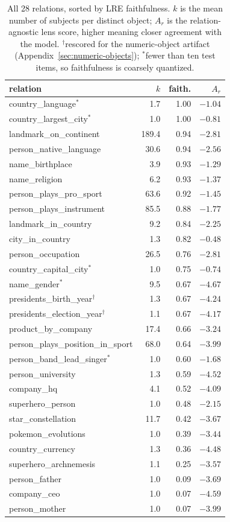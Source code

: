 \begin{table}[t]
\centering
\caption{All 28 relations, sorted by LRE faithfulness. $k$ is the mean number
of subjects per distinct object; $A_r$ is the relation-agnostic lens score, higher
meaning closer agreement with the model. $^{\dagger}$rescored for the
numeric-object artifact (Appendix~\ref{sec:numeric-objects}); $^{*}$fewer than ten test items,
so faithfulness is coarsely quantized.}
\label{tab:relations}
\begin{tabular}{@{}lrrr@{}}
\toprule
relation & $k$ & faith. & $A_r$ \\
\midrule
country\_language$^{*}$ & 1.7 & 1.00 & $-1.04$ \\
country\_largest\_city$^{*}$ & 1.0 & 1.00 & $-0.81$ \\
landmark\_on\_continent & 189.4 & 0.94 & $-2.81$ \\
person\_native\_language & 30.6 & 0.94 & $-2.56$ \\
name\_birthplace & 3.9 & 0.93 & $-1.29$ \\
name\_religion & 6.2 & 0.93 & $-1.37$ \\
person\_plays\_pro\_sport & 63.6 & 0.92 & $-1.45$ \\
person\_plays\_instrument & 85.5 & 0.88 & $-1.77$ \\
landmark\_in\_country & 9.2 & 0.84 & $-2.25$ \\
city\_in\_country & 1.3 & 0.82 & $-0.48$ \\
person\_occupation & 26.5 & 0.76 & $-2.81$ \\
country\_capital\_city$^{*}$ & 1.0 & 0.75 & $-0.74$ \\
name\_gender$^{*}$ & 9.5 & 0.67 & $-4.67$ \\
presidents\_birth\_year$^{\dagger}$ & 1.3 & 0.67 & $-4.24$ \\
presidents\_election\_year$^{\dagger}$ & 1.1 & 0.67 & $-4.17$ \\
product\_by\_company & 17.4 & 0.66 & $-3.24$ \\
person\_plays\_position\_in\_sport & 68.0 & 0.64 & $-3.99$ \\
person\_band\_lead\_singer$^{*}$ & 1.0 & 0.60 & $-1.68$ \\
person\_university & 1.3 & 0.59 & $-4.52$ \\
company\_hq & 4.1 & 0.52 & $-4.09$ \\
superhero\_person & 1.0 & 0.48 & $-2.15$ \\
star\_constellation & 11.7 & 0.42 & $-3.67$ \\
pokemon\_evolutions & 1.0 & 0.39 & $-3.44$ \\
country\_currency & 1.3 & 0.36 & $-4.48$ \\
superhero\_archnemesis & 1.1 & 0.25 & $-3.57$ \\
person\_father & 1.0 & 0.09 & $-3.69$ \\
company\_ceo & 1.0 & 0.07 & $-4.59$ \\
person\_mother & 1.0 & 0.07 & $-3.99$ \\
\bottomrule
\end{tabular}
\end{table}
